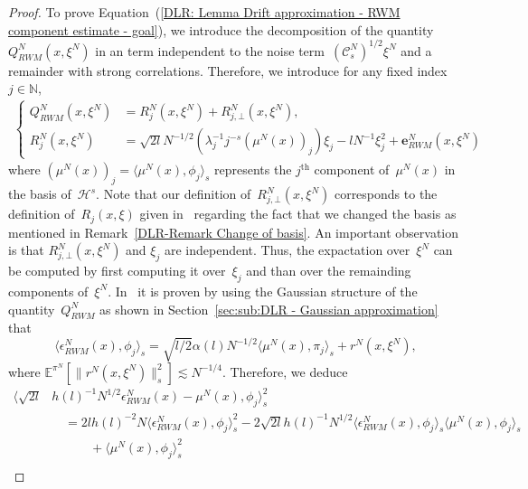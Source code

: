 \begin{proof}
 To prove Equation~(\ref{DLR: Lemma Drift approximation - RWM component estimate - goal}), we introduce the decomposition of the quantity~$ Q^N_{RWM}(x, \xi^N)$ in an term independent to the noise term~$ (\mathcal{C}_s^N)^{1/2} \xi^N$ and a remainder with strong correlations. Therefore, we introduce for any fixed index~$j \in \mathbb{N}$, 
 \begin{equation}
   \label{DLR : Lemma Drift approximation - Decomposition Q RWM}
   \begin{split}
     \begin{cases}
          Q^N_{RWM}(x, \xi^N) & = R^N_j (x, \xi^N) + R^N_{j, \bot}(x, \xi^N), \\
	  R^N_j (x, \xi^N) & = \sqrt{2l} N^{-1/2} (\lambda_j^{-1} j^{-s} (\mu^N(x))_j) \xi_j - l N^{-1} \xi_j^2 + \textbf{e}^N_{RWM}(x, \xi^N)
     \end{cases}
   \end{split}
 \end{equation}
 where $(\mu^N(x))_j = \langle \mu^N(x), \phi_j \rangle_s$ represents the $j^{\text{th}}$ component of~$\mu^N(x)$ in the basis of~$\mathcal{H}^s$. Note that our definition of~$R^N_{j, \bot}(x, \xi^N)$ corresponds to the definition of~$R_j(x, \xi)$ given in~\autocite[Chapter 2.6]{Mattingly2010} regarding the fact that we changed the basis as mentioned in Remark~\ref{DLR-Remark Change of basis}. An important observation is that $R^N_{j, \bot}(x, \xi^N)$ and $\xi_j$ are independent. Thus, the expactation over~$\xi^N$ can be computed by first computing it over~$\xi_j$ and than over the remainding components of~$\xi^N$. In~\autocite[Lemma 5.7 - 11]{Mattingly2010} it is proven by using  the Gaussian structure of the quantity~$Q^N_{RWM}$ as shown in Section~\ref{sec:sub:DLR - Gaussian approximation} that
 \begin{equation}
   \langle \epsilon_{RWM}^N (x), \phi_j \rangle_s = \sqrt{l/2} \alpha(l)  N^{-1/2} \langle \mu^N(x), \pi_j \rangle_s + r^N(x, \xi^N),
 \end{equation}
 where $ \mathbb{E}^{\pi^N}[ \|  r^N(x, \xi^N)\|_s^2] \lesssim N^{-1/4}$. Therefore, we deduce
 \begin{align*}
   \langle \sqrt{2l} & h(l)^{-1} N^{1/2} \epsilon_{RWM}^N (x) - \mu^N(x) , \phi_j \rangle_s^2 \\
   & \quad = 2l h(l)^{-2} N \langle \epsilon_{RWM}^N (x), \phi_j \rangle_s^2 - 2 \sqrt{2l} h(l)^{-1} N^{1/2} \langle\epsilon_{RWM}^N (x), \phi_j \rangle_s \langle \mu^N (x), \phi_j \rangle_s \\
   & \quad \qquad + \langle \mu^N (x), \phi_j \rangle_s^2 \\

\end{align*}
\end{proof}
